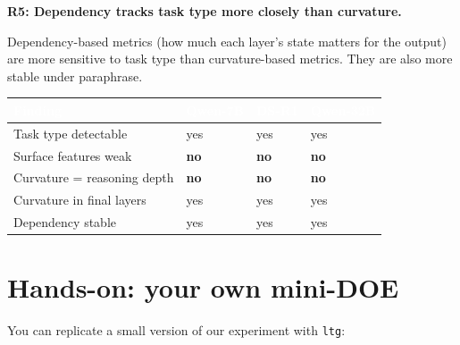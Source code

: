 \documentclass[11pt, twoside, openright]{memoir}
\begin{document}
\begin{finding}
\textbf{R5: Dependency tracks task type more closely than curvature.}

Dependency-based metrics (how much each layer's state matters for the output)
are more sensitive to task type than curvature-based metrics. They are also
more stable under paraphrase.
\end{finding}

\begin{center}
\renewcommand{\arraystretch}{1.4}\small
\begin{tabular}{@{}L{4.5cm} C{1.5cm} C{1.5cm} C{1.5cm}@{}}
\toprule
{}
\textcolor{white}{\textbf{Finding}} &
\textcolor{white}{\textbf{Qwen-7B}} &
\textcolor{white}{\textbf{DS-R1}} &
\textcolor{white}{\textbf{Qwen-32B}} \\
\midrule
Task type detectable    & yes & yes & yes \\
Surface features weak   & \textbf{no} & \textbf{no} & \textbf{no} \\
Curvature = reasoning depth & \textbf{no} & \textbf{no} & \textbf{no} \\
Curvature in final layers   & yes & yes & yes \\
Dependency stable           & yes & yes & yes \\
\bottomrule
\end{tabular}
\end{center}

\section{Hands-on: your own mini-DOE}

You can replicate a small version of our experiment with \texttt{ltg}:
\end{document}
